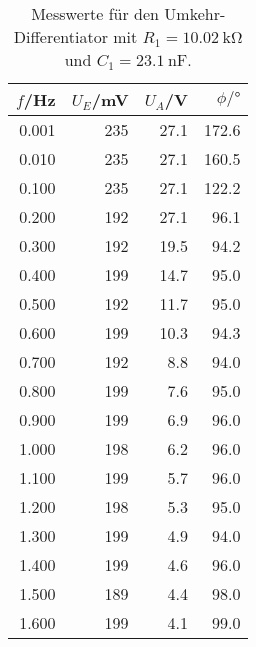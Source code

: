 \begin{table}
  \centering
\begin{tabular}{rrrr}
    $f$/Hz &  $U_E$/mV &   $U_A$/V &  $\phi/\si{\degree}$ \\
\midrule
 0.001 &  235 &  27.1 &  172.6 \\
 0.010 &  235 &  27.1 &  160.5 \\
 0.100 &  235 &  27.1 &  122.2 \\
 0.200 &  192 &  27.1 &   96.1 \\
 0.300 &  192 &  19.5 &   94.2 \\
 0.400 &  199 &  14.7 &   95.0 \\
 0.500 &  192 &  11.7 &   95.0 \\
 0.600 &  199 &  10.3 &   94.3 \\
 0.700 &  192 &   8.8 &   94.0 \\
 0.800 &  199 &   7.6 &   95.0 \\
 0.900 &  199 &   6.9 &   96.0 \\
 1.000 &  198 &   6.2 &   96.0 \\
 1.100 &  199 &   5.7 &   96.0 \\
 1.200 &  198 &   5.3 &   95.0 \\
 1.300 &  199 &   4.9 &   94.0 \\
 1.400 &  199 &   4.6 &   96.0 \\
 1.500 &  189 &   4.4 &   98.0 \\
 1.600 &  199 &   4.1 &   99.0 \\
\end{tabular}
\caption{Messwerte für den Umkehr-Differentiator mit $R_1 = \SI{10.02}{\kilo\ohm}$ und $C_1 = \SI{23.1}{\nano\farad}$.}
\label{tab:d}
\end{table}
